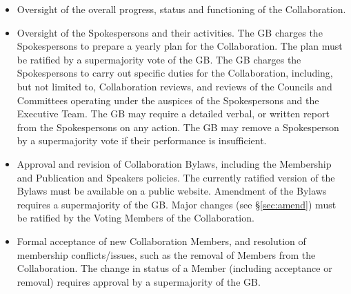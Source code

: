 \documentclass[12pt]{article}
\newcommand{\exec}{{Executive Team}}
\begin{document}
\begin{itemize}
\item Oversight of the overall progress, status and functioning of the Collaboration.  

\item Oversight of the Spokespersons and their activities.  The GB charges the Spokespersons to prepare a yearly plan for the Collaboration.  The plan must be ratified by a supermajority vote of the GB.  The GB charges the Spokespersons to carry out specific duties for the Collaboration, including, but not limited to, Collaboration reviews, and reviews of the Councils and Committees operating under the auspices of the Spokespersons and the \exec.  The GB may require a detailed verbal, or written report from the Spokespersons on any action. The GB may remove a Spokesperson by a supermajority vote if their performance is insufficient. %



\item Approval and revision of Collaboration Bylaws, including the Membership and Publication and Speakers policies.   
The currently ratified version of the Bylaws must be available on a public website.
Amendment of the Bylaws requires a supermajority of the GB.  Major changes (see \S\ref{sec:amend}) must be ratified by the Voting Members of the Collaboration.  %



\item Formal acceptance of new Collaboration Members, and resolution of membership conflicts/issues, such as the removal of Members from the Collaboration. The change in status of a Member (including acceptance or removal) requires approval by a supermajority of the GB.


\end{itemize}
\end{document}
